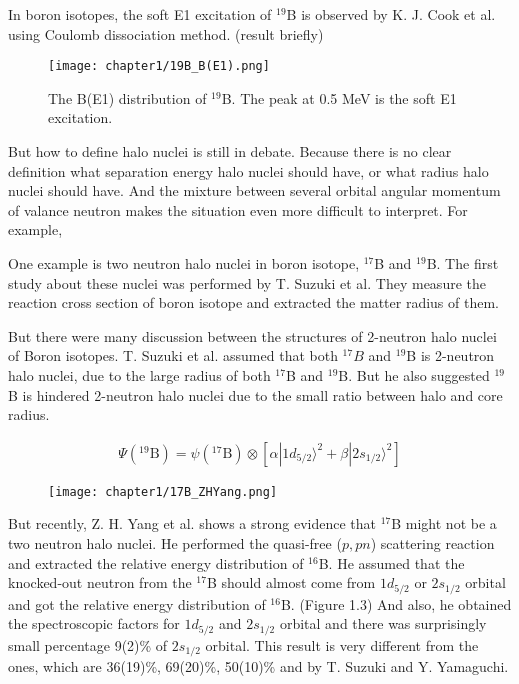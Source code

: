 In boron isotopes, the soft E1 excitation of ${}^{19}$B is observed by K. J. Cook et al.\cite{KJCook} using Coulomb dissociation method. (result briefly)


\begin{figure}[t]
    \centering
    \texttt{[image: chapter1/19B\_B(E1).png]}
    \caption{The B(E1) distribution of ${}^{19}$B. The peak at 0.5 MeV is the soft E1 excitation.}
\end{figure}

But how to define halo nuclei is still in debate. Because there is no clear definition what separation energy halo nuclei should have, or what radius halo nuclei should have. And the mixture between several orbital angular momentum of valance neutron makes the situation even more difficult to interpret. For example, 

One example is two neutron halo nuclei in boron isotope, ${}^{17}$B and ${}^{19}$B. The first study about these nuclei was performed by T. Suzuki et al\cite{suzuki99}. They measure the reaction cross section of boron isotope and extracted the matter radius of them. 

\begin{figure}
        \centering
    \end{figure}

But there were many discussion between the structures of 2-neutron halo nuclei of Boron isotopes. T. Suzuki et al. assumed that both ${}^{17}B$ and ${}^{19}$B is 2-neutron halo nuclei, due to the large radius of both ${}^{17}$B and ${}^{19}$B. But he also suggested ${}^{19}$B is hindered 2-neutron halo nuclei due to the small ratio between halo and core radius.


\begin{align}
    \Psi({}^{19}\text{B}) = \psi({}^{17}\text{B}) \otimes [\alpha |1d_{5/2} \rangle^2 + \beta |2s_{1/2} \rangle^2]    
\end{align}

\begin{figure}
    \centering
    \texttt{[image: chapter1/17B\_ZHYang.png]}
\end{figure}
But recently, Z. H. Yang et al. \cite{ZHYang} shows a strong evidence that ${}^{17}$B might not be a two neutron halo nuclei. He performed the quasi-free ($p,pn$) scattering reaction and extracted the relative energy distribution of ${}^{16}$B. He assumed that the knocked-out neutron from the ${}^{17}$B  should almost come from $1d_{5/2}$ or $2s_{1/2}$ orbital and got the relative energy distribution of ${}^{16}$B. (Figure 1.3) 
And also, he obtained the spectroscopic factors for $1d_{5/2}$ and $2s_{1/2}$ orbital and there was surprisingly small percentage 9(2)\% of $2s_{1/2}$ orbital. This result is very different from the ones, which are 36(19)\%, 69(20)\%, 50(10)\% and by T. Suzuki and Y. Yamaguchi.

